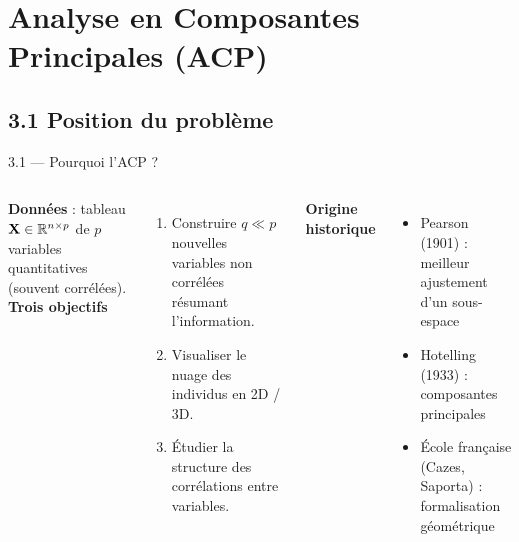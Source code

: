 \section{Analyse en Composantes Principales (ACP)}

\subsection{3.1 Position du problème}
\begin{frame}{3.1 — Pourquoi l'ACP ?}
\begin{columns}[T]
\textbf{Données} : tableau $\mathbf{X} \in \mathbb{R}^{n \times p}$ de $p$ variables
\alert{quantitatives} (souvent corrélées).\\[0.2cm]

\textbf{Trois objectifs}
\begin{enumerate}
  \item Construire $q \ll p$ \alert{nouvelles variables} non corrélées
        résumant l'information.
  \item Visualiser le nuage des individus en 2D / 3D.
  \item Étudier la structure des corrélations entre variables.
\end{enumerate}

\vspace{0.2cm}
\textbf{Origine historique}
\begin{itemize}\small
  \item Pearson (1901) : meilleur ajustement d'un sous-espace
  \item Hotelling (1933) : composantes principales
  \item École française (Cazes, Saporta) : formalisation géométrique
\end{itemize}
\end{columns}
\end{frame}

